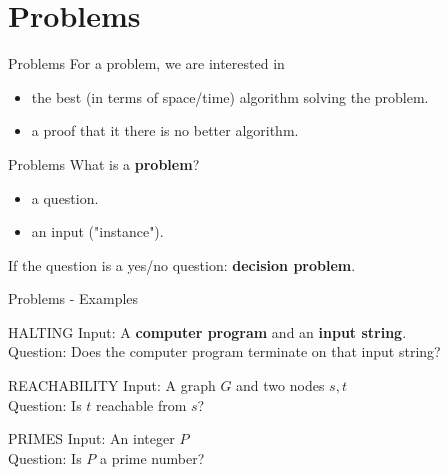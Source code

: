 \documentclass[c]{beamer}
\begin{document}
\section{Problems}
\begin{frame}{Problems}
         For a problem, we are interested in
         \begin{itemize}
			\item the best (in terms of space/time) algorithm solving the problem.
			\item a proof that it there is no better algorithm.
		\end{itemize}	  
	
\end{frame}

\begin{frame}{Problems}
        What is a \textbf{problem}?
         \begin{itemize}
			\item a question.
			\item an input ("instance").
		\end{itemize}	 
		
		If the question is a yes/no question: \textbf{decision problem}. 		
	
\end{frame}

\begin{frame}{Problems - Examples}
    \begin{block}{ HALTING }
		Input: A \textbf{computer program} and an \textbf{input string}.\\
		Question: Does the computer program terminate on that input string?
    \end{block}	
	
	\begin{block}{ REACHABILITY }
		Input: A graph $G$ and two nodes $s,t$\\
		Question: Is $t$ reachable from $s$?
    \end{block}	
    
    \begin{block}{ PRIMES }
		Input: An integer $P$\\
		Question: Is $P$ a prime number?
    \end{block}	
    
\end{frame}
\end{document}
